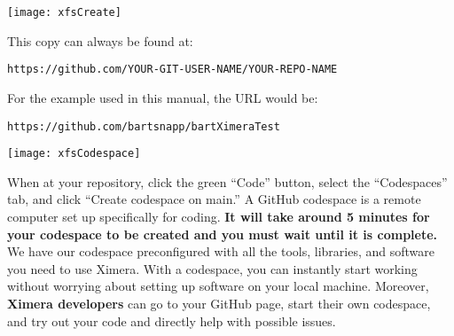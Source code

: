 \documentclass{ximera}
\begin{document}
\begin{image}
    \texttt{[image: xfsCreate]}
\end{image}
        This copy can
        always
        be found at:
        \begin{center}
            \verb!https://github.com/YOUR-GIT-USER-NAME/YOUR-REPO-NAME!
        \end{center}
        For the example used in this manual, the URL would be: 
        \begin{center}
            \verb!https://github.com/bartsnapp/bartXimeraTest!
        \end{center}
        \newpage
        \pdfOnly{\end{multicols}}
\begin{image}
    \texttt{[image: xfsCodespace]}
\end{image}
        When at your repository, click the green ``Code'' button, select the ``Codespaces''
        tab, and click ``Create codespace on main.'' A GitHub codespace is a remote computer set up
        specifically for
        coding. \textbf{It will take
            around 5
            minutes for your codespace to be created and you must wait until it
            is
            complete.} We have our codespace preconfigured with all the tools,
        libraries, and
        software you need to use Ximera. With a codespace, you can instantly
        start
        working without worrying about setting up software on your local
        machine.
        Moreover, \textbf{Ximera developers} can go to your GitHub page, start
        their
        own codespace, and try out your code and directly help with possible issues.

        \pdfOnly{\end{multicols*}}

\newpage
\end{document}
